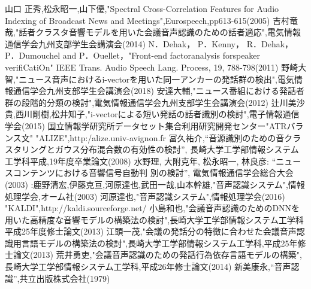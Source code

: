 \begin{thebibliography}{99}     %
山口 正秀,松永昭一,山下優,"Spectral Cross-Correlation Features for Audio Indexing of Broadcast News and Meetings",Eurospeech,pp613-615(2005)
吉村竜哉,"話者クラスタ音響モデルを用いた会議音声認識のための話者適応",電気情報通信学会九州支部学生会講演会(2014)
N．Dehak， P．Kenny， R．Dehak， P．Dumouchel and P．Ouellet，"Front-end factoranalysis forspeaker verifiCatiOn" IEEE Trans. Audio Speech Lang. Process, 19, 788-798(2011)
野崎大智,"ニュース音声におけるi-vectorを用いた同一アンカーの発話群の検出",電気情報通信学会九州支部学生会講演会(2018)
安達大輔,"ニュース番組における発話者群の段階的分類の検討",電気情報通信学会九州支部学生会講演会(2012)
辻川美沙貴,西川剛樹,松井知子,"i-vectorによる短い発話の話者識別の検討",電子情報通信学会(2015)
国立情報学研究所データセット集合利用研究開発センター"ATRバランス文"
"ALIZE",http:/alize.univ-avignon.fr
冨久祐介,“音源識別のための音クラスタリングとガウス分布混合数の有効性の検討”,
長崎大学工学部情報システム工学科平成,19年度卒業論文(2008)
水野理, 大附克年, 松永昭一, 林良彦: “ニュースコンテンツにおける音響信号自動判
別の検討”, 電気情報通信学会総合大会(2003)
:鹿野清宏,伊藤克亘,河原達也,武田一哉,山本幹雄,"音声認識システム",情報処理学会,オーム社(2003)
河原達也,"音声認識システム",情報処理学会(2016)
"KALDI",http://kaldi.sourceforge.net/
小島和也,"会議音声認識のためのDNNを用いた高精度な音響モデルの構築法の検討",長崎大学工学部情報システム工学科 平成25年度修士論文(2013)
江頭一茂,"会議の発話分の特徴に合わせた会議音声認識用言語モデルの構築法の検討",長崎大学工学部情報システム工学科,平成25年修士論文(2013)
荒井勇吏,"会議音声認識のための発話行為依存言語モデルの構築",長崎大学工学部情報システム工学科,平成26年修士論文(2014)
新美康永,“音声認識”,共立出版株式会社(1979)
\end{thebibliography}
